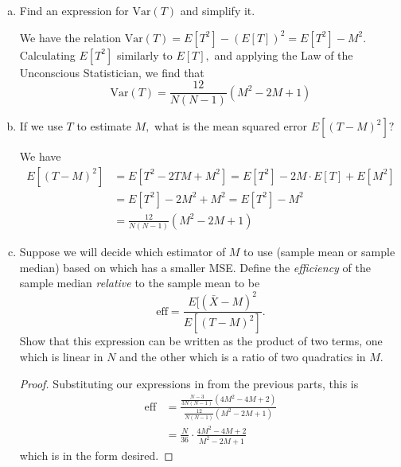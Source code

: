 \documentclass{article}
\newcommand{\var}{\mathrm{Var}}
\begin{document}
\begin{enumerate}
\begin{enumerate}[(a)]
			\item Find an expression for $\var(T)$ and simplify it.
				\begin{soln}
					We have the relation $\var(T)=E[T^2]-(E[T])^2=E[T^2]-M^2.$ Calculating $E[T^2]$ similarly to $E[T],$ and applying the Law of the Unconscious Statistician, we find that \[\var(T)=\boxed{\frac{12}{N(N-1)}(M^2-2M+1)}\]
				\end{soln}

			\item If we use $T$ to estimate $M,$ what is the mean squared error $E[(T-M)^2]?$
				\begin{soln}
					We have 
					\begin{align*}
						E[(T-M)^2]&=E[T^2-2TM+M^2]=E[T^2]-2M\cdot E[T]+E[M^2] \\
						&=E[T^2]-2M^2+M^2=E[T^2]-M^2 \\
						&= \boxed{\frac{12}{N(N-1)}(M^2-2M+1)}
					\end{align*}			
				\end{soln}

			\item Suppose we will decide which estimator of $M$ to use (sample mean or sample median) based on which has a smaller MSE. Define the \textit{efficiency} of the sample median \textit{relative} to the sample mean to be \[\text{eff}=\frac{E[(\bar{X}-M)^2}{E[(T-M)^2]}.\] Show that this expression can be written as the product of two terms, one which is linear in $N$ and the other which is a ratio of two quadratics in $M.$
				\begin{proof}
					Substituting our expressions in from the previous parts, this is
					\begin{align*}
						\text{eff} &= \frac{\frac{N-3}{3N(N-1)}(4M^2-4M+2)}{\frac{12}{N(N-1)}(M^2-2M+1)} \\
						&= \frac{N}{36} \cdot \frac{4M^2-4M+2}{M^2-2M+1}
					\end{align*} which is in the form desired.

				\end{proof}


\end{enumerate}
\end{enumerate}
\end{document}
